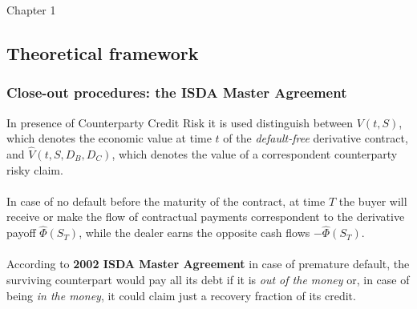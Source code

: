 \documentclass{beamer}
\begin{document}
\begin{frame}
	\Huge{\centerline{Chapter 1}}
\end{frame}

\subsection{Theoretical framework}

\begin{frame}
\frametitle{Close-out procedures: the ISDA Master Agreement}
	In presence of Counterparty Credit Risk it is used distinguish between $V(t,S)$, which denotes the economic value  at time $t$ of the \emph{default-free} derivative contract, and ${\hat{V}(t,S,D_{B},D_{C})}$, which denotes the value of a correspondent counterparty risky claim.  \\~\\
	
	In case of no default before the maturity of the contract, at time $T$ the buyer will receive or make the flow of contractual payments correspondent to the derivative payoff $\hat{\Phi}(S_{T})$, while the dealer earns the opposite cash flows $-\hat{\Phi}(S_{T})$. \\~\\

	According to \textbf{2002 ISDA Master Agreement} in case of premature default, the surviving counterpart would pay all its debt if it is \emph{out of the money} or, in case of being \emph{in the money}, it could claim just a recovery fraction of its credit.

\end{frame}
\end{document}
